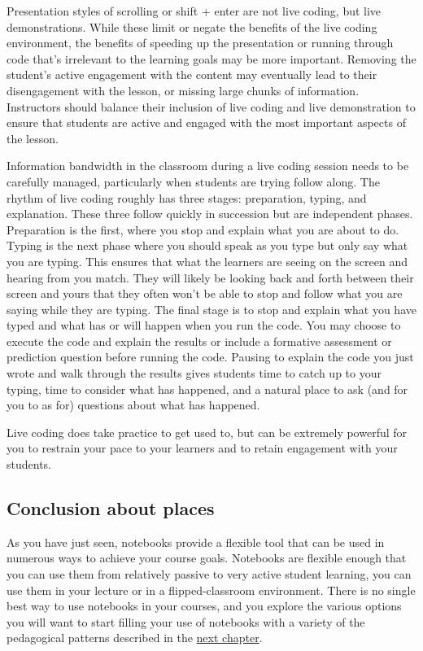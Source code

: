 \documentclass[]{book}
\begin{document}
Presentation styles of scrolling or shift + enter are not live coding,
but live demonstrations. While these limit or negate the benefits of the
live coding environment, the benefits of speeding up the presentation or
running through code that's irrelevant to the learning goals may be more
important. Removing the student's active engagement with the content may
eventually lead to their disengagement with the lesson, or missing large
chunks of information. Instructors should balance their inclusion of
live coding and live demonstration to ensure that students are active
and engaged with the most important aspects of the lesson.

Information bandwidth in the classroom during a live coding session
needs to be carefully managed, particularly when students are trying
follow along. The rhythm of live coding roughly has three stages:
preparation, typing, and explanation. These three follow quickly in
succession but are independent phases. Preparation is the first, where
you stop and explain what you are about to do. Typing is the next phase
where you should speak as you type but only say what you are typing.
This ensures that what the learners are seeing on the screen and hearing
from you match. They will likely be looking back and forth between their
screen and yours that they often won't be able to stop and follow what
you are saying while they are typing. The final stage is to stop and
explain what you have typed and what has or will happen when you run the
code. You may choose to execute the code and explain the results or
include a formative assessment or prediction question before running the
code. Pausing to explain the code you just wrote and walk through the
results gives students time to catch up to your typing, time to consider
what has happened, and a natural place to ask (and for you to as for)
questions about what has happened.

Live coding does take practice to get used to, but can be extremely
powerful for you to restrain your pace to your learners and to retain
engagement with your students.

\subsection{Conclusion about places}\label{conclusion-about-places}

As you have just seen, notebooks provide a flexible tool that can be
used in numerous ways to achieve your course goals. Notebooks are
flexible enough that you can use them from relatively passive to very
active student learning, you can use them in your lecture or in a
flipped-classroom environment. There is no single best way to use
notebooks in your courses, and you explore the various options you will
want to start filling your use of notebooks with a variety of the
pedagogical patterns described in the \protect\hyperlink{catalogue}{next
chapter}.
\end{document}
